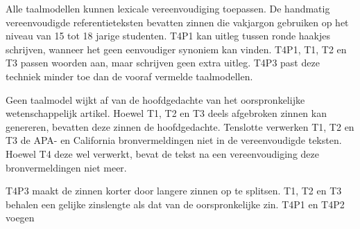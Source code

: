 \medspace

Alle taalmodellen kunnen lexicale vereenvoudiging toepassen. De handmatig vereenvoudigde referentieteksten bevatten zinnen die vakjargon gebruiken op het niveau van 15 tot 18 jarige studenten. T4P1 kan uitleg tussen ronde haakjes schrijven, wanneer het geen eenvoudiger synoniem kan vinden. T4P1, T1, T2 en T3 passen woorden aan, maar schrijven geen extra uitleg. T4P3 past deze techniek minder toe dan de vooraf vermelde taalmodellen.

\medspace

Geen taalmodel wijkt af van de hoofdgedachte van het oorspronkelijke wetenschappelijk artikel. Hoewel T1, T2 en T3 deels afgebroken zinnen kan genereren, bevatten deze zinnen de hoofdgedachte. Tenslotte verwerken T1, T2 en T3 de APA- en California bronvermeldingen niet in de vereenvoudigde teksten. Hoewel T4 deze wel verwerkt, bevat de tekst na een vereenvoudiging deze bronvermeldingen niet meer. %

\medspace

T4P3 maakt de zinnen korter door langere zinnen op te splitsen. T1, T2 en T3 behalen een gelijke zinslengte als dat van de oorspronkelijke zin. T4P1 en T4P2 voegen 



